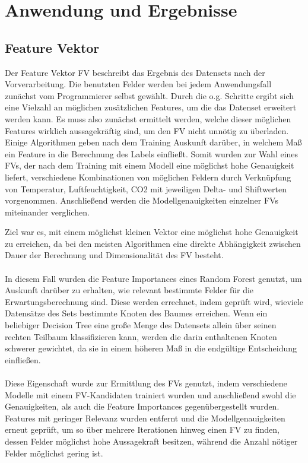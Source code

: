 \clearpage
\chapter{\textbf{Anwendung und Ergebnisse}}\label{kap5}

\section{Feature Vektor}
Der Feature Vektor FV beschreibt das Ergebnis des Datensets nach der Vorverarbeitung.
Die benutzten Felder werden bei jedem Anwendungsfall zunächst vom Programmierer selbst gewählt.
Durch die o.g. Schritte ergibt sich eine Vielzahl an möglichen zusätzlichen Features,
um die das Datenset erweitert werden kann. Es muss also zunächst ermittelt werden, welche dieser möglichen
Features wirklich aussagekräftig sind, um den FV nicht unnötig zu überladen. \\
Einige Algorithmen geben nach dem Training 
Auskunft darüber, in welchem Maß ein Feature in die Berechnung des Labels einfließt. Somit wurden zur Wahl eines
FVs, der nach dem Training mit einem Modell eine möglichst hohe Genauigkeit liefert, verschiedene Kombinationen 
von möglichen Feldern durch Verknüpfung von Temperatur, Luftfeuchtigkeit, CO2 mit jeweiligen Delta- und Shiftwerten 
vorgenommen. Anschließend werden die Modellgenauigkeiten einzelner FVs miteinander verglichen.

Ziel war es, mit einem möglichst kleinen Vektor eine möglichst hohe Genauigkeit zu erreichen, da bei den meisten Algorithmen eine 
direkte Abhängigkeit zwischen Dauer der Berechnung und Dimensionalität des FV besteht. \\\\ 

In diesem Fall wurden die Feature Importances eines Random Forest genutzt, um Auskunft darüber zu erhalten, wie 
relevant bestimmte Felder für die Erwartungsberechnung sind. Diese werden errechnet, indem geprüft wird, wieviele
Datensätze des Sets bestimmte Knoten des Baumes erreichen. Wenn ein beliebiger Decision Tree eine große Menge
des Datensets allein über seinen rechten Teilbaum klassifizieren kann, werden die darin enthaltenen Knoten schwerer
gewichtet, da sie in einem höheren Maß in die endgültige Entscheidung einfließen.\\\\

Diese Eigenschaft wurde zur Ermittlung des FVs genutzt, indem verschiedene Modelle mit einem FV-Kandidaten trainiert
wurden und anschließend swohl die Genauigkeiten, als auch die Feature Importances gegenübergestellt wurden.
Features mit geringer Relevanz wurden entfernt und die Modellgenauigkeiten erneut geprüft, um so über mehrere 
Iterationen hinweg einen FV zu finden, dessen Felder möglichst hohe Aussagekraft besitzen, während die Anzahl 
nötiger Felder möglichst gering ist.\\\\

